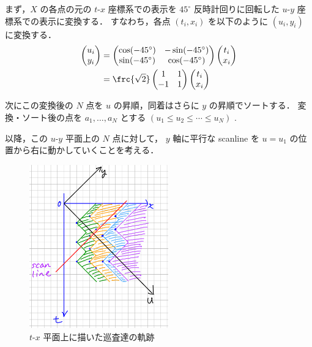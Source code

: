 まず，$X$ の各点の元の $t$-$x$ 座標系での表示を
$45^\circ$ 反時計回りに回転した $u$-$y$ 座標系での表示に変換する．
すなわち，各点 $(t_i, x_i)$ を以下のように $(u_i, y_i)$ に変換する．
\begin{align*}
	\begin{pmatrix}
		u_i \\ y_i
	\end{pmatrix}
	&=
	\begin{pmatrix}
		\cos(-45^\circ) & - \sin(-45^\circ) \\
		\sin(-45^\circ) &   \cos(-45^\circ)
	\end{pmatrix}
	\begin{pmatrix}
		t_i \\ x_i
	\end{pmatrix} \\
	&=
	\frc{\sqrt{2}}
	\begin{pmatrix}
		1  & 1 \\
		-1 & 1
	\end{pmatrix}
	\begin{pmatrix}
		t_i \\ x_i
	\end{pmatrix}
\end{align*}

次にこの変換後の $N$ 点を $u$ の昇順，同着はさらに $y$ の昇順でソートする．
変換・ソート後の点を
$a_1, \ldots, a_N$  とする $( u_1 \leq u_2 \leq \cdots \leq u_N)$ .

以降，この $u$-$y$ 平面上の $N$ 点に対して，
$y$ 軸に平行な scanline を $u = u_1$ の位置から右に動かしていくことを考える．

\begin{figure}[h]
	\centering
	\includegraphics[width=6cm]{./figures/figure1.jpeg}
	\caption{$t$-$x$ 平面上に描いた巡査達の軌跡 \label{fig:uyspace}}
\end{figure}

